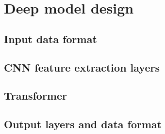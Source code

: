 \section{Deep model design}
\label{sec:Deep model design}
\subsection{Input data format}
\subsection{CNN feature extraction layers}
\subsection{Transformer}
\subsection{Output layers and data format}